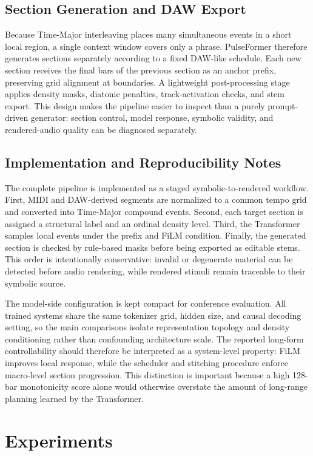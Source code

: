 \documentclass[conference]{conference-latex-template_10-17-19/IEEEtran}
\begin{document}
\subsection{Section Generation and DAW Export}
Because Time-Major interleaving places many simultaneous events in a short local region, a single context window covers only a phrase. PulseFormer therefore generates sections separately according to a fixed DAW-like schedule. Each new section receives the final bars of the previous section as an anchor prefix, preserving grid alignment at boundaries. A lightweight post-processing stage applies density masks, diatonic penalties, track-activation checks, and stem export. This design makes the pipeline easier to inspect than a purely prompt-driven generator: section control, model response, symbolic validity, and rendered-audio quality can be diagnosed separately.

\subsection{Implementation and Reproducibility Notes}
The complete pipeline is implemented as a staged symbolic-to-rendered workflow. First, MIDI and DAW-derived segments are normalized to a common tempo grid and converted into Time-Major compound events. Second, each target section is assigned a structural label and an ordinal density level. Third, the Transformer samples local events under the prefix and FiLM condition. Finally, the generated section is checked by rule-based masks before being exported as editable stems. This order is intentionally conservative: invalid or degenerate material can be detected before audio rendering, while rendered stimuli remain traceable to their symbolic source.

The model-side configuration is kept compact for conference evaluation. All trained systems share the same tokenizer grid, hidden size, and causal decoding setting, so the main comparisons isolate representation topology and density conditioning rather than confounding architecture scale. The reported long-form controllability should therefore be interpreted as a system-level property: FiLM improves local response, while the scheduler and stitching procedure enforce macro-level section progression. This distinction is important because a high 128-bar monotonicity score alone would otherwise overstate the amount of long-range planning learned by the Transformer.

\section{Experiments}
\end{document}

